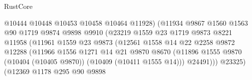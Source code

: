 \begin{lexlean}{RustCore}
\begin{coremodule}
                                        @10444
                                        @10448
                                        @10453
                                        @10458
                                        @10464
                                        @11928)
                                      (@11934
                                        @9867
                                        @1560
                                        @1563
                                        @90
                                        @1719
                                        @9874
                                        @9898
                                        @9910
                                        (@23219
                                          @1559
                                          @23
                                          @1719
                                          @9873
                                          @8221
                                          @11958
                                          (@11961
                                            @1559
                                            @23
                                            @9873
                                            (@12561
                                              @1558
                                              @14
                                              @22
                                              @2258
                                              @9872
                                              @12288
                                              (@11966
                                                @1556
                                                @1271
                                                @14
                                                @21
                                                @9870
                                                @8670
                                                (@11896
                                                  @1555
                                                  @9870
                                                  (@10404 (@10405 @9870))
                                                  (@10409 (@10411 @1555 @14)))
                                                @24491)))
                                          @23325)
                                        (@12369
                                          @1178
                                          @295
                                          @90
                                          @9898

\end{coremodule}
\end{lexlean}
